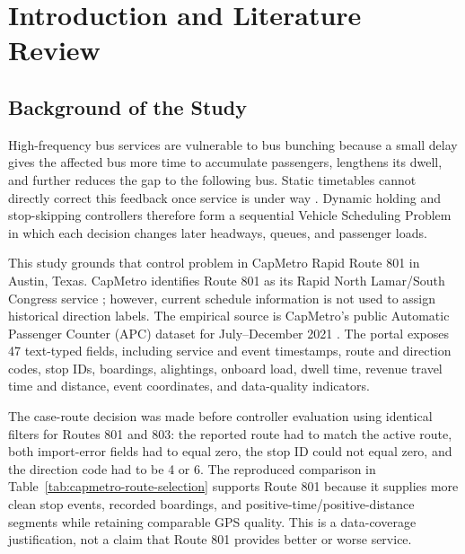 \chapter{Introduction and Literature Review}


\section{Background of the Study}
High-frequency bus services are vulnerable to bus bunching because a small delay gives the affected bus more time to accumulate passengers, lengthens its dwell, and further reduces the gap to the following bus. Static timetables cannot directly correct this feedback once service is under way \cite{Ceder2007,Daganzo2009}. Dynamic holding and stop-skipping controllers therefore form a sequential Vehicle Scheduling Problem in which each decision changes later headways, queues, and passenger loads.

This study grounds that control problem in CapMetro Rapid Route 801 in Austin, Texas. CapMetro identifies Route 801 as its Rapid North Lamar/South Congress service \cite{CapMetroRapid}; however, current schedule information is not used to assign historical direction labels. The empirical source is CapMetro's public Automatic Passenger Counter (APC) dataset for July--December 2021 \cite{TexasCapMetroAPC2021}. The portal exposes 47 text-typed fields, including service and event timestamps, route and direction codes, stop IDs, boardings, alightings, onboard load, dwell time, revenue travel time and distance, event coordinates, and data-quality indicators.

The case-route decision was made before controller evaluation using identical filters for Routes 801 and 803: the reported route had to match the active route, both import-error fields had to equal zero, the stop ID could not equal zero, and the direction code had to be 4 or 6. The reproduced comparison in Table~\ref{tab:capmetro-route-selection} supports Route 801 because it supplies more clean stop events, recorded boardings, and positive-time/positive-distance segments while retaining comparable GPS quality. This is a data-coverage justification, not a claim that Route 801 provides better or worse service.

